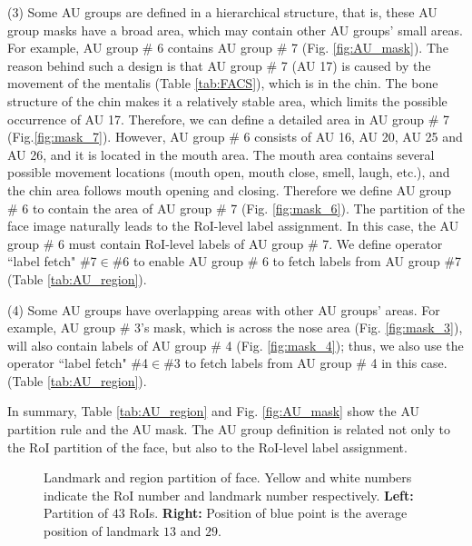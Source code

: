 \documentclass[5p,twocolumn]{elsarticle}
\makeatletter
\def\etc{etc.\@\xspace}
\makeatother
\begin{document}
(3) Some AU groups are defined in a hierarchical structure, that is, these AU group masks have a broad area, which may contain other AU groups' small areas. For example, AU group \# 6 contains AU group \# 7 (Fig. \ref{fig:AU_mask}). The reason behind such a design is that AU group \# 7 (AU 17) is caused by the movement of the mentalis (Table \ref{tab:FACS}), which is in the chin. The bone structure of the chin makes it a relatively stable area, which limits the possible occurrence of AU 17. Therefore, we can define a detailed area in AU group \# 7 (Fig.\ref{fig:mask_7}). However, AU group \# 6 consists of AU 16, AU 20, AU 25 and AU 26, and it is located in the mouth area. The mouth area contains several possible movement locations (mouth open, mouth close, smell, laugh, \etc), and the chin area follows mouth opening and closing. Therefore we define AU group \# 6 to contain the area of AU group \# 7 (Fig. \ref{fig:mask_6}). The partition of the face image naturally leads to the RoI-level label assignment. In this case, the AU group \# 6 must contain RoI-level labels of AU group \# 7. We define operator ``label fetch" \#7$ \in $\#6 to enable AU group \# 6 to fetch labels from AU group \#7 (Table \ref{tab:AU_region}).

(4) Some AU groups have overlapping areas with other AU groups' areas. For example, AU group \# 3's mask, which is across the nose area (Fig. \ref{fig:mask_3}), will also contain labels of AU group \# 4 (Fig. \ref{fig:mask_4}); thus, we also use the operator ``label fetch" \#4$\in $\#3 to fetch labels from AU group \# 4 in this case. (Table \ref{tab:AU_region}).

In summary, Table \ref{tab:AU_region} and Fig. \ref{fig:AU_mask} show the AU partition rule and the AU mask. The AU group definition is related not only to the RoI partition of the face, but also to the RoI-level label assignment.


\begin{figure}[htbp]
	\begin{adjustbox}{max width=0.5\textwidth,center}
	\end{adjustbox}
	\caption{Landmark and region partition of face. Yellow and white numbers indicate the RoI number and landmark number respectively. \textbf{Left:} Partition of $43$ RoIs. \textbf{Right:} Position of blue point is the average position of landmark $13$ and $29$.}
	\label{fig:ROI_face}
\end{figure}
\end{document}

